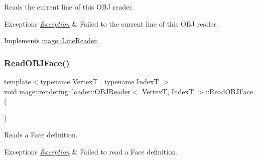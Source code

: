 Reads the current line of this O\+BJ reader.


\begin{DoxyExceptions}{Exceptions}
{\em \mbox{\hyperlink{classmage_1_1_exception}{Exception}}} & Failed to the current line of this O\+BJ reader. \\
\hline
\end{DoxyExceptions}


Implements \mbox{\hyperlink{classmage_1_1_line_reader_a8c81989a9d59ae31dd19e6d3961cfaf1}{mage\+::\+Line\+Reader}}.

\mbox{\label{classmage_1_1rendering_1_1loader_1_1_o_b_j_reader_a58d5c4e4a5a82714567413b6e17a9ec7}} 
\subsubsection{\texorpdfstring{Read\+O\+B\+J\+Face()}{ReadOBJFace()}}
{\footnotesize\ttfamily template$<$typename VertexT , typename IndexT $>$ \\
void \mbox{\hyperlink{classmage_1_1rendering_1_1loader_1_1_o_b_j_reader}{mage\+::rendering\+::loader\+::\+O\+B\+J\+Reader}}$<$ VertexT, IndexT $>$\+::Read\+O\+B\+J\+Face (\begin{DoxyParamCaption}{ }\end{DoxyParamCaption})\hspace{0.3cm}{\ttfamily [private]}}

Reads a Face definition.


\begin{DoxyExceptions}{Exceptions}
{\em \mbox{\hyperlink{classmage_1_1_exception}{Exception}}} & Failed to read a Face definition. \\
\hline
\end{DoxyExceptions}
\mbox{\label{classmage_1_1rendering_1_1loader_1_1_o_b_j_reader_a4e733a0afea4b82e3aea89fe58f5bfba}} 
